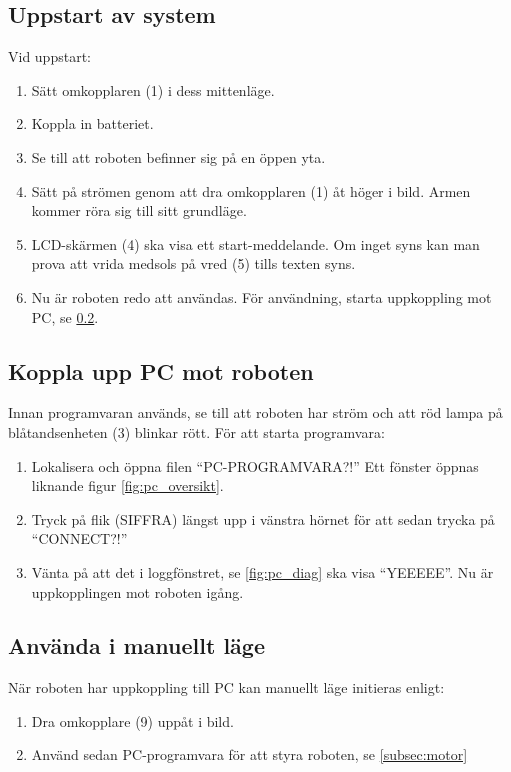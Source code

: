 \documentclass[a4paper,12pt]{article}
\begin{document}
\subsection{Uppstart av system}
Vid uppstart:
\begin{enumerate}
    \item Sätt omkopplaren (1) i dess mittenläge.
    \item Koppla in batteriet.
    \item Se till att roboten befinner sig på en öppen yta.
    \item Sätt på strömen genom att dra omkopplaren (1) åt höger i bild. Armen kommer röra sig till sitt grundläge.
    \item LCD-skärmen (4) ska visa ett start-meddelande. Om inget syns kan man prova att vrida medsols på vred (5) tills texten syns.
    \item  Nu är roboten redo att användas. För användning, starta uppkoppling mot PC, se \ref{subsec:start_pc}.
\end{enumerate}

\subsection{Koppla upp PC mot roboten}
\label{subsec:start_pc}
Innan programvaran används, se till att roboten har ström och att röd lampa på blåtandsenheten (3) blinkar rött. För att starta programvara:
\begin{enumerate}
    \item Lokalisera och öppna filen “PC-PROGRAMVARA?!”  Ett fönster öppnas liknande figur \ref{fig:pc_oversikt}. 
    \item Tryck på flik (SIFFRA) längst upp i vänstra hörnet för att sedan trycka på “CONNECT?!”
    \item Vänta på att det i loggfönstret, se \ref{fig:pc_diag}  ska visa “YEEEEE”. Nu är uppkopplingen mot roboten igång. 
\end{enumerate}

\subsection{Använda i manuellt läge}
När roboten har uppkoppling till PC kan manuellt läge initieras enligt:
\begin{enumerate}
    \item Dra omkopplare (9) uppåt i bild.
    \item Använd sedan PC-programvara för att styra roboten, se \ref{subsec:motor}
\end{enumerate}
\end{document}
